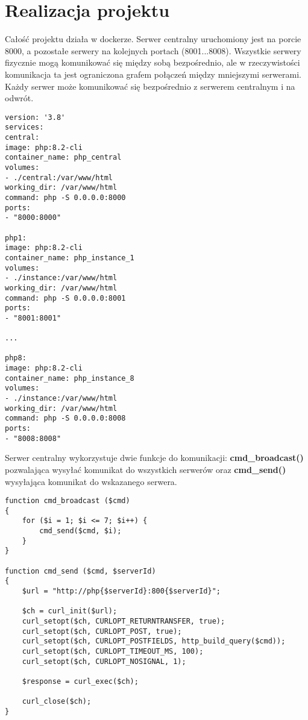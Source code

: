 \section{Realizacja projektu}
Całość projektu działa w dockerze. Serwer centralny uruchomiony jest na porcie 8000, a pozostałe serwery na kolejnych portach (8001...8008). Wszystkie serwery fizycznie mogą komunikować się między sobą bezpośrednio, ale w rzeczywistości komunikacja ta jest ograniczona grafem połączeń między mniejszymi serwerami. Każdy serwer może komunikować się bezpośrednio z serwerem centralnym i na odwrót. 

\begin{empty}
	\begin{verbatim}
version: '3.8'
services:
central:
image: php:8.2-cli
container_name: php_central
volumes:
- ./central:/var/www/html
working_dir: /var/www/html
command: php -S 0.0.0.0:8000
ports:
- "8000:8000"

php1:
image: php:8.2-cli
container_name: php_instance_1
volumes:
- ./instance:/var/www/html
working_dir: /var/www/html
command: php -S 0.0.0.0:8001
ports:
- "8001:8001"

...

php8:
image: php:8.2-cli
container_name: php_instance_8
volumes:
- ./instance:/var/www/html
working_dir: /var/www/html
command: php -S 0.0.0.0:8008
ports:
- "8008:8008"

	\end{verbatim}
\end{empty}

Serwer centralny wykorzystuje dwie funkcje do komunikacji: \textbf{cmd\_broadcast()} pozwalająca wysyłać komunikat do wszystkich serwerów oraz \textbf{cmd\_send()} wysyłająca komunikat do wskazanego serwera.

\begin{empty}
	\begin{verbatim}
function cmd_broadcast ($cmd)
{
	for ($i = 1; $i <= 7; $i++) {
		cmd_send($cmd, $i);
	}
}

function cmd_send ($cmd, $serverId)
{
	$url = "http://php{$serverId}:800{$serverId}";
	
	$ch = curl_init($url);
	curl_setopt($ch, CURLOPT_RETURNTRANSFER, true);
	curl_setopt($ch, CURLOPT_POST, true);
	curl_setopt($ch, CURLOPT_POSTFIELDS, http_build_query($cmd));
	curl_setopt($ch, CURLOPT_TIMEOUT_MS, 100);
	curl_setopt($ch, CURLOPT_NOSIGNAL, 1);
	
	$response = curl_exec($ch);
	
	curl_close($ch);
}
	\end{verbatim}
\end{empty}

